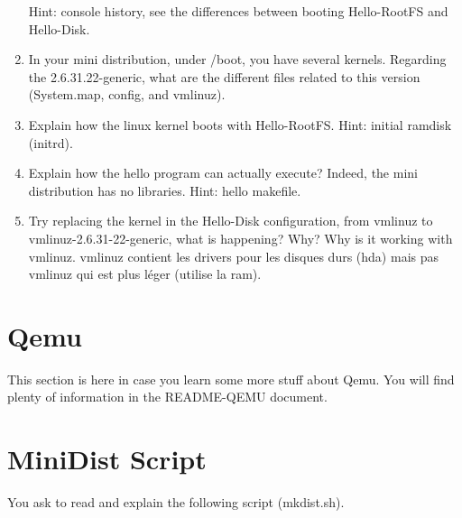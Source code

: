 \documentclass[10]{article}
\begin{document}
\begin{enumerate}
Hint: console history, see the differences between
booting Hello-RootFS and Hello-Disk.
\item
In your mini distribution, under /boot, you have
several kernels. Regarding the 2.6.31.22-generic,
what are the different files related to this version
(System.map, config, and vmlinuz).
\item
Explain how the linux kernel boots with Hello-RootFS.
Hint: initial ramdisk (initrd).
\item
Explain how the hello program can actually execute?
Indeed, the mini distribution has no libraries.
Hint: hello makefile.
\item 
Try replacing the kernel in the Hello-Disk configuration,
from vmlinuz to vmlinuz-2.6.31-22-generic, what is happening?
Why? Why is it working with vmlinuz.
vmlinuz contient les drivers pour les disques durs (hda) mais pas vmlinuz qui est plus l\'eger (utilise la ram).


\end{enumerate}



\section{Qemu}

This section is here in case you learn some more stuff about Qemu.
You will find plenty of information in the README-QEMU document.

\section{MiniDist Script}

You ask to read and explain the following script (mkdist.sh).
\end{document}
